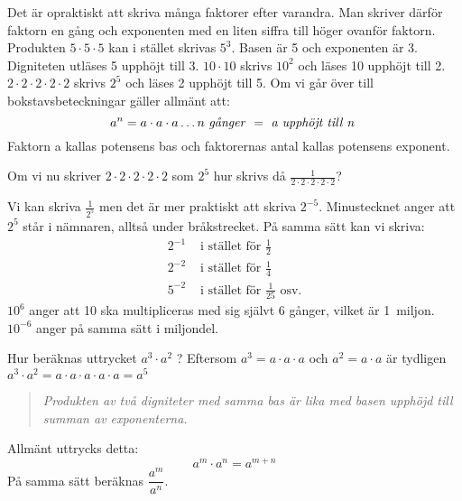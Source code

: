 Det är opraktiskt att skriva många faktorer efter varandra.
Man skriver därför faktorn en gång och exponenten med en liten siffra till
höger ovanför faktorn.
Produkten \(5 \cdot 5 \cdot 5\) kan i stället skrivas \(5^3\).
Basen är 5 och exponenten är 3.
Digniteten utläses 5 upphöjt till 3.
\(10 \cdot 10\) skrivs \(10^2\) och läses 10 upphöjt till 2.
\(2 \cdot 2 \cdot 2 \cdot 2 \cdot 2\) skrivs \(2^5\) och läses 2 upphöjt till 5.
Om vi går över till bokstavsbeteckningar gäller allmänt att:
\[a^n= a \cdot a \cdot a \ldots n \textrm{ \emph{g{\aa}nger} } = \textrm{ \emph{a
  upphöjt till n} }\]
Faktorn a kallas potensens bas och faktorernas antal kallas potensens exponent.

Om vi nu skriver \(2 \cdot 2 \cdot 2 \cdot 2 \cdot 2\) som \(2^5\) hur skrivs då
\(\frac{1}{2 \cdot 2 \cdot 2 \cdot 2 \cdot 2}\)?

Vi kan skriva \(\frac{1}{2^5}\) men det är mer praktiskt att skriva \(2^{-5}\).
Minustecknet anger att \(2^5\) står i nämnaren, alltså under bråkstrecket.
På samma sätt kan vi skriva:
\begin{align*}
2^{-1} & \text{ i stället för } \frac{1}{2} \\
2^{-2} & \text{ i stället för } \frac{1}{4} \\
5^{-2} & \text{ i stället för } \frac{1}{25} \text{ osv.}
\end{align*}
\(10^6\) anger att 10 ska multipliceras med sig självt 6 gånger, vilket är
1~miljon.
\(10^{-6}\) anger på samma sätt i miljondel.

Hur beräknas uttrycket \(a^3 \cdot a^2\) ?
Eftersom \(a^3 = a \cdot a \cdot a\) och \(a^2 = a \cdot a\) är tydligen
\(a^3 \cdot a^2 = a \cdot a \cdot a \cdot a \cdot a = a^5\)

\begin{quote}\emph{Produkten av två digniteter med samma bas är lika med basen
    upphöjd till summan av exponenterna.}\end{quote}
Allmänt uttrycks detta:
\[a^m \cdot a^n = a^{m+n}\]
På samma sätt beräknas \(\dfrac{a^m}{a^n}\).

